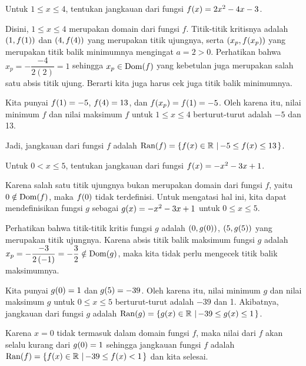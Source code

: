 	\begin{contoh}
		Untuk $ 1 \leq x \leq 4 $, tentukan jangkauan dari fungsi $ \mathop{}\!{f}{\left({x}\right)} = 2x^{2} - 4x - 3 $.
	\end{contoh}
	\begin{jawab}
		Disini, $ 1 \leq x \leq 4 $ merupakan domain dari fungsi $ f $. Titik-titik kritisnya adalah $ \left(1, \mathop{}\!{f}{\left({1}\right)}\right) $ dan $ \left(4, \mathop{}\!{f}{\left({4}\right)}\right) $ yang merupakan titik ujungnya, serta $ \left(x_{p}, \mathop{}\!{f}{\left({x_{p}}\right)}\right) $ yang merupakan titik balik minimumnya mengingat $ a = 2 > 0 $. Perhatikan bahwa $ x_{p} = -\dfrac{-4}{2\left(2\right)} = 1 $ sehingga $ x_{p} \in \mathop{}\!{\operatorname{Dom}}{\left({f}\right)} $ yang kebetulan juga merupakan salah satu absis titik ujung. Berarti kita juga harus cek juga titik balik minimumnya.
		\par Kita punyai $ \mathop{}\!{f}{\left({1}\right)} = -5 $, $ \mathop{}\!{f}{\left({4}\right)} = 13 $, dan $ \mathop{}\!{f}{\left({x_{p}}\right)} = \mathop{}\!{f}{\left({1}\right)} = -5 $. Oleh karena itu, nilai minimum $ f $ dan nilai maksimum $ f $ untuk $ 1 \leq x \leq 4 $ berturut-turut adalah $ -5 $ dan 13.
		\par Jadi, jangkauan dari fungsi $ f $ adalah $ \mathop{}\!{\operatorname{Ran}}{\left({f}\right)} = \mathop{}\!\left\lbrace{{\mathop{}\!{f}{\left({x}\right)} \in \mathbb{R}} \, \left|\, {-5 \leq \mathop{}\!{f}{\left({x}\right)} \leq 13}\right.}\right\rbrace $.
	\end{jawab}
	
	\begin{contoh}
		Untuk $ 0 < x \leq 5 $, tentukan jangkauan dari fungsi $ \mathop{}\!{f}{\left({x}\right)} = -x^{2} - 3x + 1 $.
	\end{contoh}
	\begin{jawab}
		Karena salah satu titik ujungnya bukan merupakan domain dari fungsi $ f $, yaitu $ 0 \notin \mathop{}\!{\operatorname{Dom}}{\left({f}\right)} $, maka $ \mathop{}\!{f}{\left({0}\right)} $ tidak terdefinisi. Untuk mengatasi hal ini, kita dapat mendefinisikan fungsi $ g $ sebagai $ \mathop{}\!{g}{\left({x}\right)} = -x^{2} - 3x + 1 $ untuk $ 0 \leq x \leq 5 $.
		\par Perhatikan bahwa titik-titik kritis fungsi $ g $ adalah $ \left(0, \mathop{}\!{g}{\left({0}\right)}\right) $, $ \left(5, \mathop{}\!{g}{\left({5}\right)}\right) $ yang merupakan titik ujungnya. Karena absis titik balik maksimum fungsi $ g $ adalah $ x_{p} = -\dfrac{-3}{2\left(-1\right)} = -\dfrac{3}{2} \notin \mathop{}\!{\operatorname{Dom}}{\left({g}\right)} $, maka kita tidak perlu mengecek titik balik maksimumnya.
		\par Kita punyai $ \mathop{}\!{g}{\left({0}\right)} = 1 $ dan $ \mathop{}\!{g}{\left({5}\right)} = -39 $. Oleh karena itu, nilai minimum $ g $ dan nilai maksimum $ g $ untuk $ 0 \leq x \leq 5 $ berturut-turut adalah $ -39 $ dan 1. Akibatnya, jangkauan dari fungsi $ g $ adalah $ \mathop{}\!{\operatorname{Ran}}{\left({g}\right)} = \mathop{}\!\left\lbrace{{\mathop{}\!{g}{\left({x}\right)} \in \mathbb{R}} \, \left|\, {-39 \leq \mathop{}\!{g}{\left({x}\right)} \leq 1}\right.}\right\rbrace $.
		\par Karena $ x = 0 $ tidak termasuk dalam domain fungsi $ f $, maka nilai dari $ f $ akan selalu kurang dari $ \mathop{}\!{g}{\left({0}\right)} = 1 $ sehingga jangkauan fungsi $ f $ adalah $ \mathop{}\!{\operatorname{Ran}}{\left({f}\right)} = \mathop{}\!\left\lbrace{{\mathop{}\!{f}{\left({x}\right)} \in \mathbb{R}} \, \left|\, {-39 \leq \mathop{}\!{f}{\left({x}\right)} < 1}\right.}\right\rbrace $ dan kita selesai.
	\end{jawab}
	
